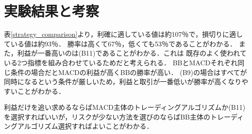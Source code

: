 \section{実験結果と考察}

表\ref{strategy_comparison}より，利確に適している値は約107％で，損切りに適している値は約93％．
勝率は高くて67％，低くても53％であることがわかる．
また，利益が一番高いのは(B11)であることがわかる．これは
既存のよく使われている2つ指標を組み合わせているためだと考えられる．
BBとMACDそれぞれ同じ条件の場合だとMACDの利益が高くBBの勝率が高い．
(B9)の場合はすべてが同時になるという条件が厳しいため，利益と取引が一番低いが勝率が高くなりやすいことがわかる．

利益だけを追い求めるならばMACD主体のトレーディングアルゴリズムか(B11)を選択すればいいが，リスクが少ない方法を選びのならばBB主体のトレーディングアルゴリズム選択すればよいことがわかる．
\newpage